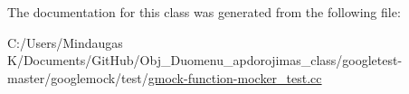 The documentation for this class was generated from the following file\+:\begin{DoxyCompactItemize}
\item 
C\+:/\+Users/\+Mindaugas K/\+Documents/\+Git\+Hub/\+Obj\+\_\+\+Duomenu\+\_\+apdorojimas\+\_\+class/googletest-\/master/googlemock/test/\mbox{\hyperlink{googletest-master_2googlemock_2test_2gmock-function-mocker__test_8cc}{gmock-\/function-\/mocker\+\_\+test.\+cc}}\end{DoxyCompactItemize}

